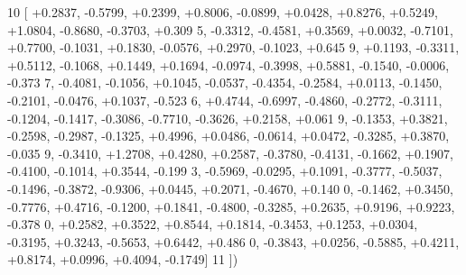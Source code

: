 \begin{DoxyCode}
10 [ +0.2837, -0.5799, +0.2399, +0.8006, -0.0899, +0.0428, +0.8276, +0.5249, +1.0804, -0.8680, -0.3703, +0.309
      5, -0.3312, -0.4581, +0.3569, +0.0032, -0.7101, +0.7700, -0.1031, +0.1830, -0.0576, +0.2970, -0.1023, +0.645
      9, +0.1193, -0.3311, +0.5112, -0.1068, +0.1449, +0.1694, -0.0974, -0.3998, +0.5881, -0.1540, -0.0006, -0.373
      7, -0.4081, -0.1056, +0.1045, -0.0537, -0.4354, -0.2584, +0.0113, -0.1450, -0.2101, -0.0476, +0.1037, -0.523
      6, +0.4744, -0.6997, -0.4860, -0.2772, -0.3111, -0.1204, -0.1417, -0.3086, -0.7710, -0.3626, +0.2158, +0.061
      9, -0.1353, +0.3821, -0.2598, -0.2987, -0.1325, +0.4996, +0.0486, -0.0614, +0.0472, -0.3285, +0.3870, -0.035
      9, -0.3410, +1.2708, +0.4280, +0.2587, -0.3780, -0.4131, -0.1662, +0.1907, -0.4100, -0.1014, +0.3544, -0.199
      3, -0.5969, -0.0295, +0.1091, -0.3777, -0.5037, -0.1496, -0.3872, -0.9306, +0.0445, +0.2071, -0.4670, +0.140
      0, -0.1462, +0.3450, -0.7776, +0.4716, -0.1200, +0.1841, -0.4800, -0.3285, +0.2635, +0.9196, +0.9223, -0.378
      0, +0.2582, +0.3522, +0.8544, +0.1814, -0.3453, +0.1253, +0.0304, -0.3195, +0.3243, -0.5653, +0.6442, +0.486
      0, -0.3843, +0.0256, -0.5885, +0.4211, +0.8174, +0.0996, +0.4094, -0.1749]
11 ])
\end{DoxyCode}
